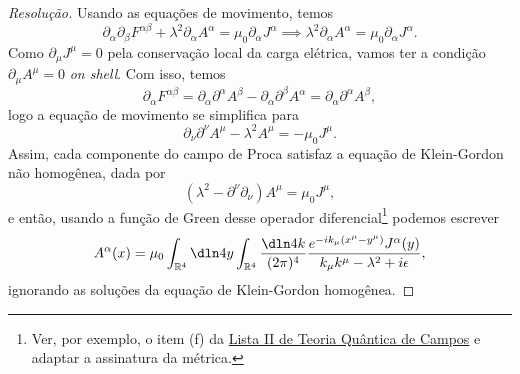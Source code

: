 \begin{proof}[Resolução]
   Usando as equações de movimento, temos
   \begin{equation*}
      \partial_{\alpha} \partial_\beta F^{\alpha \beta} + \lambda^2 \partial_\alpha A^{\alpha} = \mu_0 \partial_\alpha J^\alpha \implies \lambda^2 \partial_\alpha A^{\alpha} = \mu_0 \partial_\alpha J^\alpha.
   \end{equation*}
   Como \(\partial_\mu J^\mu = 0\) pela conservação local da carga elétrica, vamos ter a condição \(\partial_\mu A^\mu = 0\) \emph{on shell}. Com isso, temos
   \begin{equation*}
      \partial_\alpha F^{\alpha \beta} = \partial_\alpha \partial^\alpha A^\beta - \partial_\alpha \partial^\beta A^\alpha = \partial_\alpha \partial^\alpha A^\beta,
   \end{equation*}
   logo a equação de movimento se simplifica para
   \begin{equation*}
       \partial_\nu \partial^\nu A^\mu - \lambda^2 A^\mu = -\mu_0 J^\mu.
   \end{equation*}
   Assim, cada componente do campo de Proca satisfaz a equação de Klein-Gordon não homogênea, dada por
   \begin{equation*}
       \left(\lambda^2 - \partial^\nu \partial_\nu\right)A^\mu = \mu_0 J^\mu,
   \end{equation*}
   e então, usando a função de Green desse operador diferencial\footnote{Ver, por exemplo, o item (f) da \href{https://github.com/louisradial/4305107-quantum-field-theory-i/releases/tag/pset2}{Lista II de Teoria Quântica de Campos} e adaptar a assinatura da métrica.} podemos escrever
   \begin{equation*}
      A^{\alpha}(x) = \mu_0 \int_{\mathbb{R}^4} \dln4y \int_{\mathbb{R}^4} \frac{\dln4k}{(2\pi)^4} \frac{e^{-i k_\mu (x^\mu - y^\mu)} J^\alpha(y)}{k_\mu k^\mu - \lambda^2 + i \epsilon},
   \end{equation*}
   ignorando as soluções da equação de Klein-Gordon homogênea.


\end{proof}
